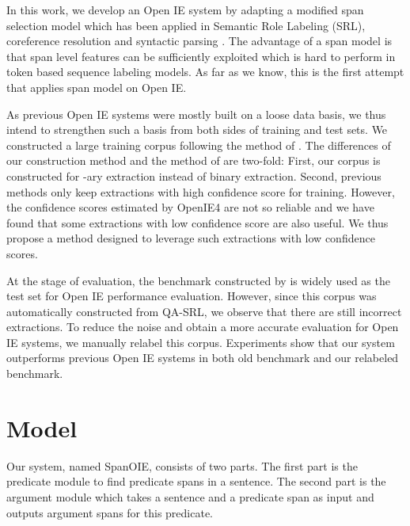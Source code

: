 \documentclass[letterpaper]{article} \usepackage{aaai20}  \usepackage{times}  \usepackage{helvet} \usepackage{courier}  \usepackage[hyphens]{url}  \urlstyle{rm} \def\UrlFont{\rm}  \usepackage{graphicx}  \frenchspacing  \setlength{\pdfpagewidth}{8.5in}  \setlength{\pdfpageheight}{11in}
\begin{document}
In this work, we develop an Open IE system by adapting a modified span selection model which has been applied in Semantic Role Labeling (SRL)\cite{Ouchi2018ASS,he-etal-2018-syntax,Li2019DependencyOS,Zhao2013IntegrativeSD,zhao-etal-2009-semantic,li-etal-2018-unified,cai2018full}, coreference resolution\cite{shou-zhao-2012-system,zhang-etal-2012-chinese} and syntactic parsing \cite{zhang-etal-2016-probabilistic,ma-zhao-2012-fourth,Li2020GlobalGreedy,zhou-zhao-2019-head,zhao-etal-2009-cross,li-etal-2018-seq2seq}. The advantage of a span model is that span level features can be sufficiently exploited which is hard to perform in token based sequence labeling models. As far as we know, this is the first attempt that applies span model on Open IE. 

As previous Open IE systems were mostly built on a loose data basis, we thus intend to strengthen such a basis from both sides of training and test sets. We constructed a large training corpus following the method of \cite{Cui2018NeuralOI}. The differences of our construction method and the method of \cite{Cui2018NeuralOI} are two-fold: First, our corpus is constructed for -ary extraction instead of binary extraction. Second, previous methods only keep extractions with high confidence score for training. However, the confidence scores estimated by OpenIE4 are not so reliable and we have found that some extractions with low confidence score are also useful. We thus propose a method designed to leverage such extractions with low confidence scores.

At the stage of evaluation, the benchmark constructed by \cite{Stanovsky2016CreatingAL} is widely used as the test set for Open IE performance evaluation. However, since this corpus was automatically constructed from QA-SRL, we observe that there are still incorrect extractions. To reduce the noise and obtain a more accurate evaluation for Open IE systems, we manually relabel this corpus. Experiments show that our system outperforms previous Open IE systems in both old benchmark and our relabeled benchmark. 

\section{Model}
Our system, named SpanOIE, consists of two parts. The first part is the predicate module to find predicate spans in a sentence. The second part is the argument module which takes a sentence and a predicate span as input and outputs argument spans for this predicate. 
\end{document}
